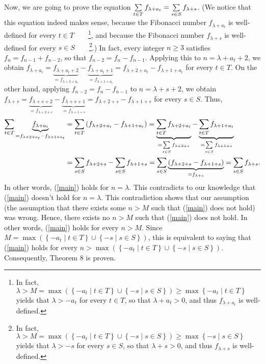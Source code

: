 \documentclass[numbers=enddot,12pt,final,onecolumn,notitlepage]{scrartcl}%
\numberwithin{exer}{section}
\theoremstyle{definition}
\let\sumnonlimits\sum
\renewcommand{\sum}{\sumnonlimits\limits}
\begin{document}
Now, we are going to prove the equation $\sum\limits_{t\in T}f_{\lambda+a_{t}%
}=\sum\limits_{s\in S}f_{\lambda+s}$. (We notice that this equation indeed
makes sense, because the Fibonacci number $f_{\lambda+a_{t}}$ is well-defined
for every $t\in T$\ \ \ \ \footnote{In fact, $\lambda>M=\max\left(  \left\{
-a_{t}\mid t\in T\right\}  \cup\left\{  -s\mid s\in S\right\}  \right)
\geq\max\left\{  -a_{t}\mid t\in T\right\}  $ yields that $\lambda>-a_{t}$ for
every $t\in T$, so that $\lambda+a_{t}>0$, and thus $f_{\lambda+a_{t}}$ is
well-defined.}, and because the Fibonacci number $f_{\lambda+s}$ is
well-defined for every $s\in S$\ \ \ \ \footnote{In fact, $\lambda
>M=\max\left(  \left\{  -a_{t}\mid t\in T\right\}  \cup\left\{  -s\mid s\in
S\right\}  \right)  \geq\max\left\{  -s\mid s\in S\right\}  $ yields that
$\lambda>-s$ for every $s\in S$, so that $\lambda+s>0$, and thus
$f_{\lambda+s}$ is well-defined.}.) In fact, every integer $n\geq3$ satisfies
$f_{n}=f_{n-1}+f_{n-2}$, so that $f_{n-2}=f_{n}-f_{n-1}$. Applying this to
$n=\lambda+a_{t}+2$, we obtain $f_{\lambda+a_{t}}=\underbrace{f_{\lambda
+a_{t}+2}}_{=f_{\lambda+2+a_{t}}}-\underbrace{f_{\lambda+a_{t}+1}%
}_{=f_{\lambda+1+a_{t}}}=f_{\lambda+2+a_{t}}-f_{\lambda+1+a_{t}}$ for every
$t\in T$. On the other hand, applying $f_{n-2}=f_{n}-f_{n-1}$ to
$n=\lambda+s+2$, we obtain $f_{\lambda+s}=\underbrace{f_{\lambda+s+2}%
}_{=f_{\lambda+2+s}}-\underbrace{f_{\lambda+s+1}}_{=f_{\lambda+1+s}%
}=f_{\lambda+2+s}-f_{\lambda+1+s}$ for every $s\in S$. Thus,%
\begin{align*}
\sum\limits_{t\in T}\underbrace{f_{\lambda+a_{t}}}_{=f_{\lambda+2+a_{t}%
}-f_{\lambda+1+a_{t}}}  &  =\sum\limits_{t\in T}\left(  f_{\lambda+2+a_{t}%
}-f_{\lambda+1+a_{t}}\right)  =\underbrace{\sum\limits_{t\in T}f_{\lambda
+2+a_{t}}}_{=\sum\limits_{s\in S}f_{\lambda+2+s}}-\underbrace{\sum
\limits_{t\in T}f_{\lambda+1+a_{t}}}_{=\sum\limits_{s\in S}f_{\lambda+1+s}}\\
&  =\sum\limits_{s\in S}f_{\lambda+2+s}-\sum\limits_{s\in S}f_{\lambda
+1+s}=\sum\limits_{s\in S}\underbrace{\left(  f_{\lambda+2+s}-f_{\lambda
+1+s}\right)  }_{=f_{\lambda+s}}=\sum\limits_{s\in S}f_{\lambda+s}.
\end{align*}
In other words, (\ref{main}) holds for $n=\lambda$. This contradicts to our
knowledge that (\ref{main}) doesn't hold for $n=\lambda$. This contradiction
shows that our assumption (the assumption that there exists some $n>M$ such
that (\ref{main}) does not hold) was wrong. Hence, there exists no $n>M$ such
that (\ref{main}) does not hold. In other words, (\ref{main}) holds for every
$n>M$. Since $M=\max\left(  \left\{  -a_{t}\mid t\in T\right\}  \cup\left\{
-s\mid s\in S\right\}  \right)  $, this is equivalent to saying that
(\ref{main}) holds for every $n>\max\left(  \left\{  -a_{t}\mid t\in
T\right\}  \cup\left\{  -s\mid s\in S\right\}  \right)  $. Consequently,
Theorem 8 is proven.
\end{document}

